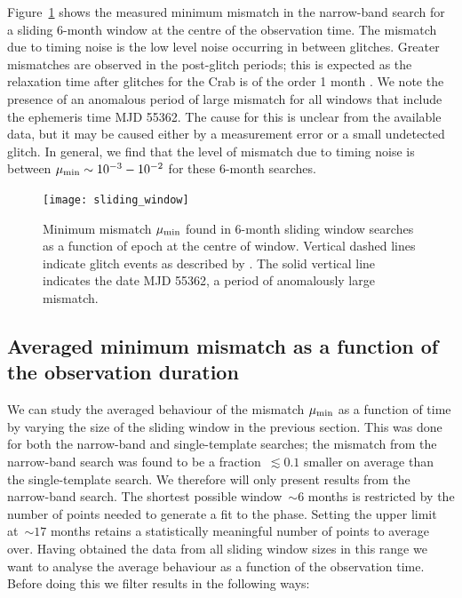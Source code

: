\documentclass[../full_thesis/full_thesis.tex]{subfiles}
\begin{document}
Figure~\ref{fig: sliding window} shows the measured minimum mismatch in the
narrow-band search for a sliding 6-month window at the centre of the
observation time. The mismatch due to timing noise is the low level noise
occurring in between glitches. Greater mismatches are observed in the
post-glitch periods; this is expected as the relaxation time after glitches for
the Crab is of the order 1 month \citep{Lyne2012book}.  We note the presence of
an anomalous period of large mismatch for all  windows that include the
ephemeris time MJD 55362. The cause for this is unclear from the available
data, but it may be caused either by a measurement error or a small undetected
glitch. In general, we find that the level of mismatch due to timing noise is
between $\mu_{\mathrm{min}} \sim 10^{-3} - 10^{-2}$ for these 6-month searches.

\begin{figure}[htb]
\centering
\texttt{[image: sliding\_window]}
\caption{Minimum mismatch $\mu_{\mathrm{min}}$ found in 6-month sliding window searches
    as a function of epoch
     at the centre of  window.  Vertical dashed lines
    indicate glitch events as described by \citet{Espinoza2011}. The solid
    vertical line indicates the date MJD 55362, a period of anomalously
    large mismatch.}
\label{fig: sliding window}
\end{figure}



\subsection{Averaged minimum mismatch as a function of the observation duration}
\label{sec: averaged mismatch as a function of the observation duration}

We can study the averaged behaviour of the mismatch $\mu_{\mathrm{min}}$ as a function of
time by varying the size of the sliding window in the previous section. This
was done for both the narrow-band and single-template searches; the mismatch
from the narrow-band search was found to be  a fraction~$\lesssim 0.1$ smaller
on average than the single-template search. We therefore will only present
results from the narrow-band search. The shortest possible window~$\sim 6$
months is restricted by the number of points needed to generate a fit to the
phase.  Setting the upper limit at~$\sim 17$ months retains a statistically
meaningful number of points to average over. Having obtained the data from all
sliding window sizes in this range we want to analyse the average behaviour as
a function of the observation time. Before doing this we filter results in the
following ways:
\end{document}
